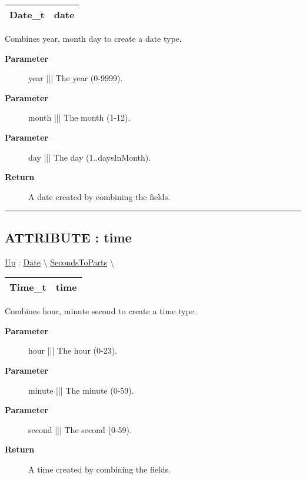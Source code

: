 {\renewcommand{\arraystretch}{1.5}
\begin{tabularx}{\textwidth}{|>{\raggedright\arraybackslash}l|X|}
\hline
\hspace{0pt}Date\_t & date \\
\hline
\end{tabularx}
}

\par
Combines year, month day to create a date type.

\par
\begin{description}
\item [\textbf{Parameter}] year ||| The year (0-9999).
\item [\textbf{Parameter}] month ||| The month (1-12).
\item [\textbf{Parameter}] day ||| The day (1..daysInMonth).
\item [\textbf{Return}] A date created by combining the fields.
\end{description}

\rule{\linewidth}{0.5pt}
\subsection*{ATTRIBUTE : time}
\hypertarget{ecldoc:date.secondstoparts.result.time}{}
\hyperlink{ecldoc:date.secondstoparts}{Up} :
\hspace{0pt} \hyperlink{ecldoc:Date}{Date} \textbackslash 
\hspace{0pt} \hyperlink{ecldoc:date.secondstoparts}{SecondsToParts} \textbackslash 

{\renewcommand{\arraystretch}{1.5}
\begin{tabularx}{\textwidth}{|>{\raggedright\arraybackslash}l|X|}
\hline
\hspace{0pt}Time\_t & time \\
\hline
\end{tabularx}
}

\par
Combines hour, minute second to create a time type.

\par
\begin{description}
\item [\textbf{Parameter}] hour ||| The hour (0-23).
\item [\textbf{Parameter}] minute ||| The minute (0-59).
\item [\textbf{Parameter}] second ||| The second (0-59).
\item [\textbf{Return}] A time created by combining the fields.
\end{description}


